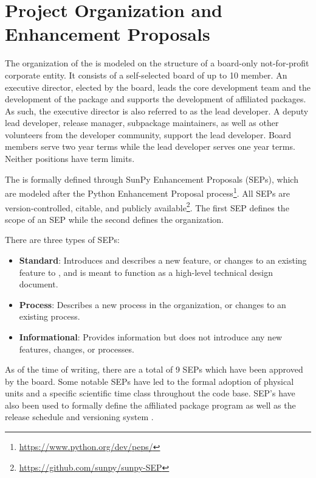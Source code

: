 \section{Project Organization and Enhancement Proposals}
\label{sec:proj_org}

The organization of the \sunpyproj is modeled on the structure of a board-only not-for-profit corporate entity.
It consists of a self-selected board of up to 10 member.
An executive director, elected by the board, leads the core development team and the development of the \sunpypkg  package and supports the development of affiliated packages.
As such, the executive director is also referred to as the lead developer.
A deputy lead developer, release manager, subpackage maintainers, as well as other volunteers from the developer community, support the lead developer.
Board members serve two year terms while the lead developer serves one year terms. Neither positions have term limits.

The \sunpyproj is formally defined through SunPy Enhancement Proposals (SEPs), which are modeled after the Python Enhancement Proposal process\footnote{\url{https://www.python.org/dev/peps/}}.
All SEPs are version-controlled, citable, and publicly available\footnote{\url{https://github.com/sunpy/sunpy-SEP}}.
The first SEP \citep[SEP-0001][]{sep-0001} defines the scope of an SEP \citep[similar to][]{ape-0001} while the second \citep[SEP-0002][]{sep-0002} defines the  \sunpyproj organization.

There are three types of SEPs:
\begin{itemize}
    \item \textbf{Standard}: Introduces and describes a new feature, or changes to an existing feature to \sunpypkg, and is meant to function as a high-level technical design document.
    \item \textbf{Process}: Describes a new process in the organization, or changes to an existing process.
    \item \textbf{Informational}: Provides information but does not introduce any new features, changes, or processes.
\end{itemize}

As of the time of writing, there are a total of 9 SEPs which have been approved by the board.
Some notable SEPs have led to the formal adoption of physical units \citep[SEP-0003,][see \autoref{sec:units}]{sep-0003} and a specific scientific time class \citep[SEP-0008,][see \autoref{sec:units}]{sep-0008} throughout the code base.
SEP's have also been used to formally define the affiliated package program \citep[SEP-0004,][see \autoref{sec:affil_package}]{sep-0004} as well as the release schedule and versioning system \citep[SEP-0009,][see \autoref{sec:release}]{sep-0009}.
